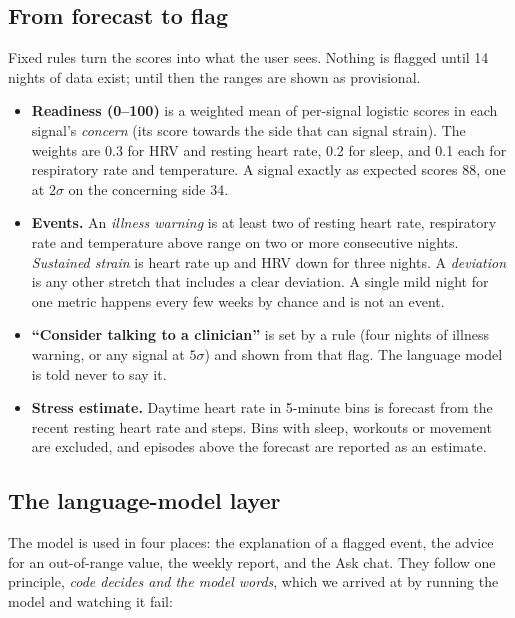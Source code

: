 \documentclass[11pt,a4paper]{article}
\begin{document}
\subsection{From forecast to flag}\label{sec:rules}
Fixed rules turn the scores into what the user sees. Nothing is flagged until 14 nights of data exist; until then the ranges are shown as provisional.
\begin{itemize}
  \item \textbf{Readiness (0--100)} is a weighted mean of per-signal logistic scores in each signal's \emph{concern} (its score towards the side that can signal strain). The weights are 0.3 for HRV and resting heart rate, 0.2 for sleep, and 0.1 each for respiratory rate and temperature. A signal exactly as expected scores 88, one at $2\sigma$ on the concerning side 34.
  \item \textbf{Events.} An \emph{illness warning} is at least two of resting heart rate, respiratory rate and temperature above range on two or more consecutive nights. \emph{Sustained strain} is heart rate up and HRV down for three nights. A \emph{deviation} is any other stretch that includes a clear deviation. A single mild night for one metric happens every few weeks by chance and is not an event.
  \item \textbf{``Consider talking to a clinician''} is set by a rule (four nights of illness warning, or any signal at $5\sigma$) and shown from that flag. The language model is told never to say it.
  \item \textbf{Stress estimate.} Daytime heart rate in 5-minute bins is forecast from the recent resting heart rate and steps. Bins with sleep, workouts or movement are excluded, and episodes above the forecast are reported as an estimate.
\end{itemize}

\subsection{The language-model layer}\label{sec:llm}
The model is used in four places: the explanation of a flagged event, the advice for an out-of-range value, the weekly report, and the Ask chat. They follow one principle, \emph{code decides and the model words}, which we arrived at by running the model and watching it fail:
\end{document}
